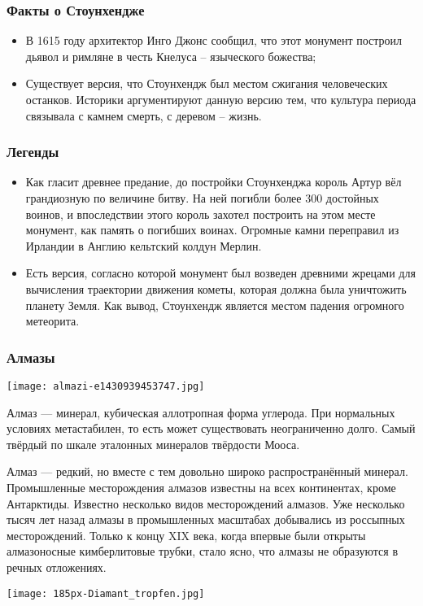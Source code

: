 \documentclass{beamer}
\begin{document}
\begin{frame}
\frametitle{Факты о Стоунхендже}
\begin{itemize}
	\item В 1615 году архитектор Инго Джонс сообщил, что этот монумент построил дьявол и римляне в честь Кнелуса – языческого божества;
	\item Существует версия, что Стоунхендж был местом сжигания человеческих останков.
	 Историки аргументируют данную версию тем, что культура периода связывала с камнем смерть, с деревом – жизнь.
\end{itemize}
\end{frame}

\begin{frame}
\frametitle{Легенды}
\begin{itemize}
\item Как гласит древнее предание, до постройки Стоунхенджа король Артур вёл грандиозную по величине битву. 
На ней погибли более 300 достойных воинов, и впоследствии этого король захотел построить на этом месте монумент, как память о погибших воинах. 
Огромные камни переправил из Ирландии в Англию кельтский колдун Мерлин.
\item Есть версия, согласно которой монумент был возведен древними жрецами для вычисления траектории движения кометы, которая должна была уничтожить планету Земля.
 Как вывод, Стоунхендж является местом падения огромного метеорита.
 \end{itemize}
 \end{frame}
 
 \begin{frame}
 \frametitle{Алмазы}
 \centering\texttt{[image: almazi-e1430939453747.jpg]}\par
Алмаз — минерал, кубическая аллотропная форма углерода. При нормальных условиях метастабилен, то есть может существовать неограниченно долго.
Самый твёрдый по шкале эталонных минералов твёрдости Мооса. 
 \end{frame}
 
 \begin{frame}
 Алмаз — редкий, но вместе с тем довольно широко распространённый минерал. Промышленные месторождения алмазов известны на всех континентах, кроме Антарктиды. Известно несколько видов месторождений алмазов. Уже несколько тысяч лет назад алмазы в промышленных масштабах добывались из россыпных месторождений. Только к концу XIX века, когда впервые были открыты алмазоносные кимберлитовые трубки, стало ясно, что алмазы не образуются в речных отложениях.\par
 \centering\texttt{[image: 185px-Diamant\_tropfen.jpg]}\par
 \end{frame}
 
\end{document}
